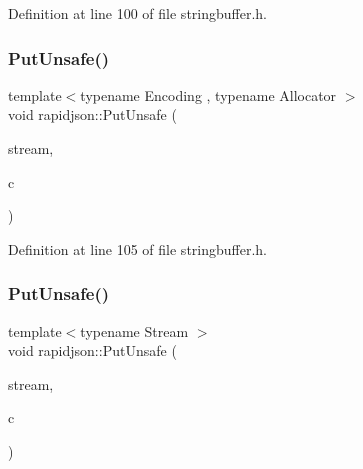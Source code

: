 Definition at line 100 of file stringbuffer.\+h.


\begin{DoxyCode}{0}

\end{DoxyCode}
\mbox{\label{namespacerapidjson_ad338901177ac5feb414a9e620bfbd717}} 
\subsubsection{\texorpdfstring{PutUnsafe()}{PutUnsafe()}\hspace{0.1cm}{\footnotesize\ttfamily [1/2]}}
{\footnotesize\ttfamily template$<$typename Encoding , typename Allocator $>$ \\
void rapidjson\+::\+Put\+Unsafe (\begin{DoxyParamCaption}\item[{\mbox{\hyperlink{classrapidjson_1_1_generic_string_buffer}{Generic\+String\+Buffer}}$<$ \mbox{\hyperlink{classrapidjson_1_1_encoding}{Encoding}}, \mbox{\hyperlink{classrapidjson_1_1_allocator}{Allocator}} $>$ \&}]{stream,  }\item[{typename Encoding\+::\+Ch}]{c }\end{DoxyParamCaption})}



Definition at line 105 of file stringbuffer.\+h.


\begin{DoxyCode}{0}

\end{DoxyCode}
\mbox{\label{namespacerapidjson_a0a774dcffe8ae07686f459ae017d2f20}} 
\subsubsection{\texorpdfstring{PutUnsafe()}{PutUnsafe()}\hspace{0.1cm}{\footnotesize\ttfamily [2/2]}}
{\footnotesize\ttfamily template$<$typename Stream $>$ \\
void rapidjson\+::\+Put\+Unsafe (\begin{DoxyParamCaption}\item[{\mbox{\hyperlink{classrapidjson_1_1_stream}{Stream}} \&}]{stream,  }\item[{typename Stream\+::\+Ch}]{c }\end{DoxyParamCaption})}



